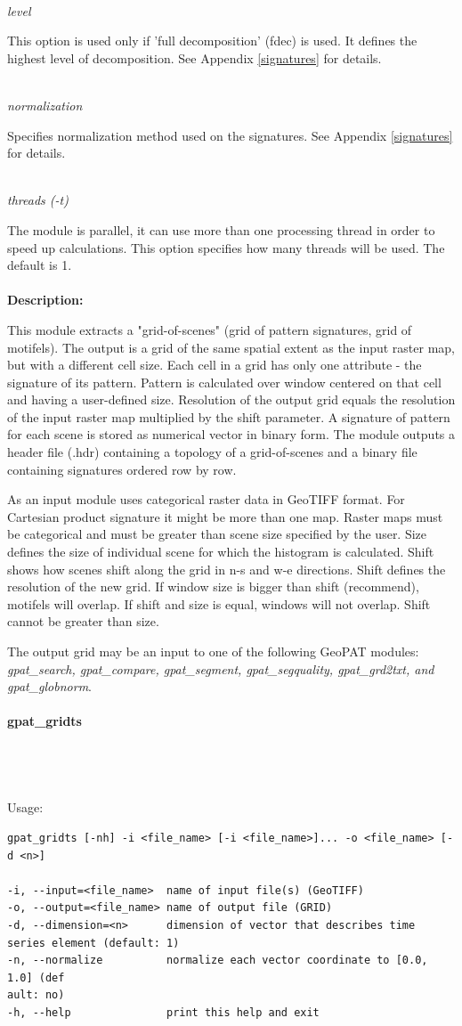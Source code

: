 \documentclass[12pt,margin=0.5in]{article}
\newcommand{\newparagraph}[1]{\paragraph{#1}\mbox{}\\}
\newcommand{\newoption}[1]{\mbox{}\\{\it #1}}
\begin{document}
\newoption{level}

This option is used only if 'full decomposition' (fdec) is used. It defines the highest level of decomposition. See Appendix \ref{signatures} for details.

\newoption{normalization}

Specifies normalization method used on the signatures. See Appendix \ref{signatures} for details.

\newoption{threads (-t)}

The module is parallel, it can use more than one processing thread in order to speed up calculations. This option specifies how many threads will be used. The default is 1.
\\\\
{\bf Description:}

This module extracts a "grid-of-scenes" (grid of pattern signatures, grid of motifels). The output is a grid of the same spatial extent as the input raster map, but with a different cell size. Each cell in a grid has only one attribute - the signature of its pattern. Pattern is calculated over window centered on that cell and having a user-defined size. Resolution of the output grid equals the resolution of the input raster map multiplied by the shift parameter. A signature of pattern for each scene is stored as numerical vector in binary form. The module outputs a header file (.hdr) containing a topology of a grid-of-scenes and a binary file containing signatures ordered row by row.

As an input module uses categorical raster data in GeoTIFF format. For Cartesian product signature it might be more than one map. Raster maps must be categorical and must be greater than scene size specified by the user. Size defines the size of individual scene for which the histogram is calculated. Shift shows how scenes shift along the grid in n-s and w-e directions. Shift defines the resolution of the new grid. If window size is bigger than shift (recommend), motifels will overlap. If shift and size is equal, windows will not overlap. Shift cannot be greater than size. 

The output grid may be an input to one of the following GeoPAT modules: {\it gpat\_search, gpat\_compare, gpat\_segment, gpat\_segquality, gpat\_grd2txt, and gpat\_globnorm}.

\newparagraph{gpat\_gridts}
{}
\\\\
Usage:

\begin{minipage}{\linewidth}
\begin{lstlisting}
gpat_gridts [-nh] -i <file_name> [-i <file_name>]... -o <file_name> [-d <n>]

-i, --input=<file_name>  name of input file(s) (GeoTIFF)
-o, --output=<file_name> name of output file (GRID)
-d, --dimension=<n>      dimension of vector that describes time series element (default: 1)
-n, --normalize          normalize each vector coordinate to [0.0, 1.0] (def
ault: no)
-h, --help               print this help and exit
\end{lstlisting}
\end{minipage}
\end{document}
